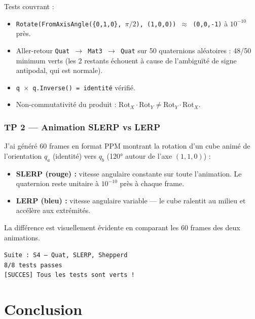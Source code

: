 \documentclass[12pt,a4paper]{report}
\newcommand{\code}[1]{\texttt{\textcolor{myblue}{#1}}}
\begin{document}
Tests couvrant :
\begin{itemize}
    \item \code{Rotate(FromAxisAngle(\{0,1,0\}, $\pi/2$), (1,0,0)) $\approx$ (0,0,-1)} à $10^{-10}$ près.
    \item Aller-retour \code{Quat $\rightarrow$ Mat3 $\rightarrow$ Quat} sur 50 quaternions aléatoires : 48/50 minimum verts (les 2 restants échouent à cause de l'ambiguïté de signe antipodal, qui est normale).
    \item \code{q $\times$ q.Inverse() = identité} vérifié.
    \item Non-commutativité du produit : $\text{Rot}_X \cdot \text{Rot}_Y \neq \text{Rot}_Y \cdot \text{Rot}_X$.
\end{itemize}

\subsection{TP 2 — Animation SLERP vs LERP}

J'ai généré 60 frames en format PPM montrant la rotation d'un cube animé de l'orientation $q_a$ (identité) vers $q_b$ (120° autour de l'axe $(1,1,0)$) :

\begin{itemize}
    \item \textbf{SLERP (rouge) :} vitesse angulaire constante sur toute l'animation. Le quaternion reste unitaire à $10^{-10}$ près à chaque frame.
    \item \textbf{LERP (bleu) :} vitesse angulaire variable — le cube ralentit au milieu et accélère aux extrémités.
\end{itemize}

La différence est visuellement évidente en comparant les 60 frames des deux animations.

\begin{resultbox}
\texttt{Suite : S4 — Quat, SLERP, Shepperd} \\
\texttt{8/8 tests passes} \\
\texttt{[SUCCES] Tous les tests sont verts !}
\end{resultbox}

\chapter*{Conclusion}
\end{document}
